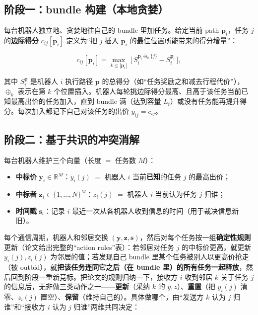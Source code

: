 \subsection{阶段一：bundle 构建（本地贪婪）}
\label{sec:mapf-cbba-build}

每台机器人独立地、贪婪地往自己的 bundle 里加任务。给定当前 path $\mathbf{p}_i$，任务 $j$ 的\textbf{边际得分} $c_{ij}[\mathbf{p}_i]$ 定义为“把 $j$ 插入 $\mathbf{p}_i$ 的最佳位置所能带来的得分增量”\cite{choi2009cbba}：

\begin{equation}
  c_{ij}[\mathbf{p}_i]=\max_{k\le |\mathbf{p}_i|}\ \big[\,S_i^{\mathbf{p}_i\oplus_k\{j\}}-S_i^{\mathbf{p}_i}\,\big],
  \label{eq:mapf-cbba-marginal}
\end{equation}

其中 $S_i^{\mathbf{p}}$ 是机器人 $i$ 执行路径 $\mathbf{p}$ 的总得分（如“任务奖励之和减去行程代价”），$\oplus_k$ 表示在第 $k$ 个位置插入。机器人每轮挑边际得分最高、且高于该任务当前已知最高出价的任务加入，直到 bundle 满（达到容量 $L_t$）或没有任务能再提升得分。每次加入都记下自己对该任务的出价 $y_{ij}=c_{ij}$。

\subsection{阶段二：基于共识的冲突消解}
\label{sec:mapf-cbba-consensus}

每台机器人维护三个向量（长度 $=$ 任务数 $M$）：

\begin{itemize}
  \item \textbf{中标价} $\mathbf{y}_i\in\mathbb{R}^M$：$y_i(j)$ $=$ 机器人 $i$ 当前\textbf{已知}的任务 $j$ 的最高出价；
  \item \textbf{中标者} $\mathbf{z}_i\in\{1,\dots,N\}^M$：$z_i(j)$ $=$ 机器人 $i$ 当前认为任务 $j$ 归谁；
  \item \textbf{时间戳} $\mathbf{s}_i$：记录 $i$ 最近一次从各机器人收到信息的时间（用于裁决信息新旧）。
\end{itemize}

每个通信周期，机器人和邻居交换 $(\mathbf{y},\mathbf{z},\mathbf{s})$，然后对每个任务按一组\textbf{确定性规则}更新（论文给出完整的“action rules”表）：若邻居对任务 $j$ 的中标价更高，就更新 $y_i(j),z_i(j)$ 为邻居的值；若发现自己 bundle 里某个任务被别人以更高价抢走（被 outbid），就\textbf{把该任务连同它之后（在 bundle 里）的所有任务一起释放}，然后回到阶段一重新竞标。把论文的规则归纳一下，接收方 $i$ 收到邻居 $k$ 关于任务 $j$ 的信息后，无非做三类动作之一——\textbf{更新}（采纳 $k$ 的 $y,z$）、\textbf{重置}（把 $y_i(j)$ 清零、$z_i(j)$ 置空）、\textbf{保留}（维持自己的）。具体做哪个，由“发送方 $k$ 认为 $j$ 归谁”和“接收方 $i$ 认为 $j$ 归谁”两维共同决定：

